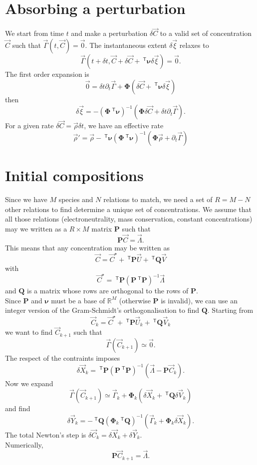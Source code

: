 \documentclass[aps]{revtex4}
\newcommand{\mymat}[1]{\bm{#1}}
\newcommand{\mytrn}[1]{~^{\mathsf{T}}{#1}}
\begin{document}
\section{Absorbing a perturbation}
We start from time $t$ and make a perturbation $\delta\vec{C}$ to a valid set of concentration $\vec{C}$ such that 
$\vec{\Gamma}(t,\vec{C})=\vec{0}$.
The instantaneous extent $\delta\vec{\xi}$ relaxes to 
$$
\vec{\Gamma}(t+\delta t,\vec{C}+\delta\vec{C}+\mytrn{\mymat{\nu}}\delta\vec{\xi}) = \vec{0}.
$$
The first order expansion
is
$$
	\vec{0} = \delta t \partial_t \vec{\Gamma} + \mymat{\Phi}\left( \delta\vec{C} + \mytrn{\mymat{\nu}}\delta\vec{\xi} \right)
$$
then
$$
	\delta\vec{\xi} = -\left(\mymat{\Phi}\mytrn{\mymat{\nu}}\right)^{-1}\left(\mymat{\Phi}\delta\vec{C}+\delta t \partial_t\vec{\Gamma}\right).
$$
For a given rate $\delta\vec{C} = \vec{\rho} \delta t$, we have an effective rate
$$
	\vec{\rho}' = \vec{\rho} -  \mytrn{\mymat{\nu}}\left(\mymat{\Phi}\mytrn{\mymat{\nu}}\right)^{-1}\left(\mymat{\Phi}\vec{\rho}+\partial_t\vec{\Gamma}\right)
$$

\section{Initial compositions}
Since we have $M$ species and $N$ relations to match, we need
a set of $R=M-N$ other relations to find determine a unique set of concentrations.
We assume that all those relations (electroneutrality, mass conservation, constant concentrations)
may we written as a $R\times M$ matrix $\mymat{P}$ such that
$$
	\mymat{P}\vec{C} = \vec{\Lambda}.
$$
This means that any concentration may be written as
$$
	\vec{C} = \vec{C}^\star + \mytrn{\mymat{P}} \vec{U} + \mytrn{\mymat{Q}} \vec{V}
$$
with
$$
	\vec{C}^\star = \mytrn{\mymat{P}} \left(\mymat{P}\mytrn{\mymat{P}}\right)^{-1}\vec{\Lambda}
$$
and $\mymat{Q}$ is a matrix whose rows are orthogonal to the rows of $\mymat{P}$.\\
Since $\mymat{P}$ and $\mymat{\nu}$ must be a base of $\mathbb{R}^{M}$ (otherwise $\mymat{P}$ is invalid), we can 
use an integer version of the Gram-Schmidt's orthogonalisation to find $\mymat{Q}$.
Starting from 
$$
	\vec{C}_k = \vec{C}^\star + \mytrn{\mymat{P}} \vec{U}_k + \mytrn{\mymat{Q}} \vec{V}_k
$$
we want to find $\vec{C}_{k+1}$ such that
$$
	\vec{\Gamma}(\vec{C}_{k+1}) \simeq \vec{0}.
$$
The respect of the contraints imposes
$$
	\delta\vec{X}_k = \mytrn{\mymat{P}} 
	\left(\mymat{P}\mytrn{\mymat{P}}\right)^{-1} \left(\vec{\Lambda} - \mymat{P}\vec{C}_k\right).
$$
Now we expand
$$
	\vec{\Gamma}\left(\vec{C}_{k+1}\right) \simeq \vec{\Gamma}_k + \mymat{\Phi}_k\left(\delta\vec{X}_k+\mytrn{\mymat{Q}} \delta\vec{V}_k\right)
$$
and find
$$
	\delta\vec{Y}_k = -\mytrn{\mymat{Q}} \left(\mymat{\Phi}_k\mytrn{\mymat{Q}}\right)^{-1} \left(\vec{\Gamma}_k+\mymat{\Phi}_k \delta\vec{X}_k\right).
$$
The total Newton's step is $\delta\vec{C}_k=\delta\vec{X}_k+\delta\vec{Y}_k$.\\
Numerically,
$$
	\mymat{P}\vec{C}_{k+1} = \vec{\Lambda}.
$$
\end{document}
